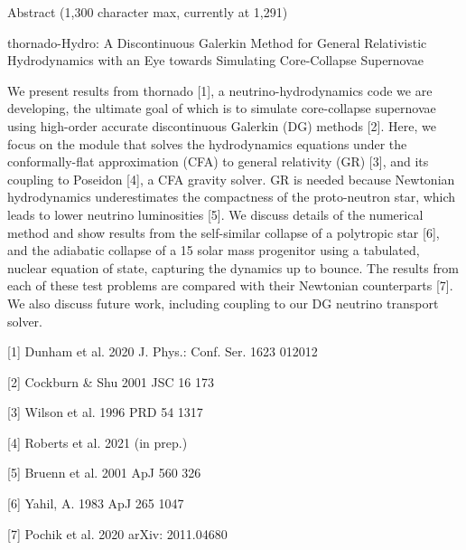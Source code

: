 \documentclass{article}
\begin{document}
\begin{center}
Abstract (1,300 character max, currently at 1,291)
\end{center}

\begin{center}
thornado-Hydro: A Discontinuous Galerkin Method for General Relativistic Hydrodynamics with an Eye towards Simulating Core-Collapse Supernovae
\end{center}

We present results from thornado [1], a neutrino-hydrodynamics code we are developing, the ultimate goal of which is to simulate core-collapse supernovae using high-order accurate discontinuous Galerkin (DG) methods [2]. Here, we focus on the module that solves the hydrodynamics equations under the conformally-flat approximation (CFA) to general relativity (GR) [3], and its coupling to Poseidon [4], a CFA gravity solver. GR is needed because Newtonian hydrodynamics underestimates the compactness of the proto-neutron star, which leads to lower neutrino luminosities [5]. We discuss details of the numerical method and show results from the self-similar collapse of a polytropic star [6], and the adiabatic collapse of a 15 solar mass progenitor using a tabulated, nuclear equation of state, capturing the dynamics up to bounce. The results from each of these test problems are compared with their Newtonian counterparts [7]. We also discuss future work, including coupling to our DG neutrino transport solver.

[1] Dunham et al. 2020 J. Phys.: Conf. Ser. 1623 012012

[2] Cockburn \& Shu 2001 JSC 16 173

[3] Wilson et al. 1996 PRD 54 1317

[4] Roberts et al. 2021 (in prep.)

[5] Bruenn et al. 2001 ApJ 560 326

[6] Yahil, A. 1983 ApJ 265 1047

[7] Pochik et al. 2020 arXiv: 2011.04680
\end{document}
